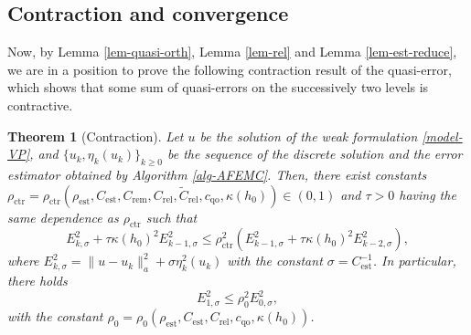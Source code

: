 \documentclass[preprint,times]{elsarticle}%
\newtheorem{theorem}{Theorem}[section]
\numberwithin{algorithm}{section}
\numberwithin{equation}{section}
\newcommand{\rel}{\mathrm{rel}}
\newcommand{\est}{\mathrm{est}}
\newcommand{\rem}{\mathrm{rem}}
\newcommand{\ctr}{\mathrm{ctr}}
\newcommand{\qoo}{\mathrm{qo}}
\newcommand{\anorm}[1]{\|#1\|_a}
\newcommand{\wtC}{\widetilde{C}}
\def\leq{\leqslant}
\def\geq{\geqslant}
\begin{document}
\subsection{Contraction and convergence}
Now, by Lemma \ref{lem-quasi-orth}, Lemma \ref{lem-rel} and Lemma \ref{lem-est-reduce}, we are in a position to prove the following contraction result of the quasi-error, which shows that some sum of quasi-errors on the successively two levels is contractive. 
\begin{theorem}[Contraction]\label{thm-contract}
	Let $u$ be the solution of the weak formulation \eqref{model-VP}, and $\{u_k,\eta_k(u_k)\}_{k \geq 0}$ be the sequence of the discrete solution
	 and the error estimator obtained by Algorithm \ref{alg-AFEMC}. Then, there exist constants $\rho_\ctr = \rho_\ctr(\rho_\est,C_\est,C_\rem,C_\rel,\wtC_\rel,c_\qoo,\kappa(h_0)) 
	 \in (0,1)$ and $\tau > 0$ having the same dependence as $\rho_\ctr$ such that 
	\begin{equation}\label{result-contract}
	E_{k,\sigma}^2 + \tau \kappa(h_0)^2 E_{k-1,\sigma}^2 \leq \rho_\ctr^2 
	(E_{k-1,\sigma}^2 + \tau\kappa(h_0)^2 E_{k-2,\sigma}^2), 
	\end{equation}
where $E_{k,\sigma}^2 = \anorm{u-u_k}^2 + \sigma \eta_k^2(u_k)$ with the constant $\sigma = C_\est^{-1}$. In particular, there holds 
	\begin{equation}\label{result-contract-1-0}
		E_{1,\sigma}^2 \leq \rho_0^2 E_{0,\sigma}^2, 
	\end{equation}
with the constant $\rho_0 = \rho_0(\rho_\est,C_\est,C_\rel,c_\qoo,\kappa(h_0))$.
\end{theorem}
\end{document}
